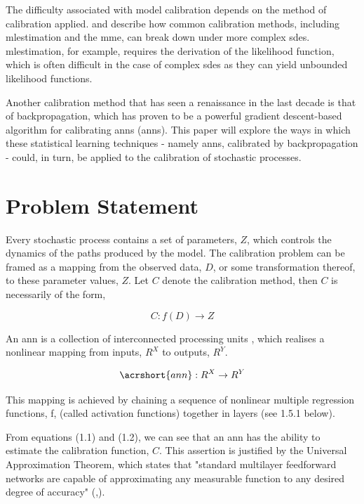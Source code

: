 \documentclass[11pt,oneside,openany,a4paper,english, report, goldenblock
]{usthesis}
\begin{document}
The difficulty associated with model calibration depends on the method of calibration applied. \citet{Mongwe} and \citet{Honore} describe how common calibration methods, including \acrfull{mlestimation} and the \acrfull{mme}, can break down under more complex \acrshort{sde}s. \acrshort{mlestimation}, for example, requires the derivation of the likelihood function, which is often difficult in the case of complex \acrshort{sde}s as they can yield unbounded likelihood functions.


Another calibration method that has seen a renaissance in the last decade is that of backpropagation, which has proven to be a powerful gradient descent-based algorithm for calibrating \acrlong{ann}s (\acrshort{ann}s). 
This paper will explore the ways in which these statistical learning techniques - namely \acrshort{ann}s, calibrated by backpropagation - could, in turn, be applied to the calibration of stochastic processes.



\section{Problem Statement}
Every stochastic process contains a set of parameters, $ Z $, which controls the dynamics of the paths produced by the model. The calibration problem can be framed as a mapping from the observed data, $ D $, or some transformation thereof, to these parameter values, $ Z $. Let $C$ denote the calibration method, then $C$ is necessarily of the form,

\begin{equation}
C:f \left( D \right) \rightarrow Z
\end{equation}

An \acrshort{ann} is a collection of interconnected processing units \citep{Teugels}, which realises a nonlinear mapping from inputs, $ R^X $ to outputs, $ R^Y $.

\begin{equation}
\acrshort{ann}: R^X \rightarrow R^Y
\end{equation}

This mapping is achieved by chaining a sequence of nonlinear multiple regression functions, f, (called activation functions) together in layers (see 1.5.1 below).


From equations (1.1) and (1.2), we can see that an \acrshort{ann} has the ability to estimate the calibration function, $ C $. 
This assertion is justified by the Universal Approximation Theorem, which states that "standard multilayer feedforward networks are capable of approximating any measurable function to any desired degree of accuracy" (,\citeyear{Hornik}).
\end{document}

